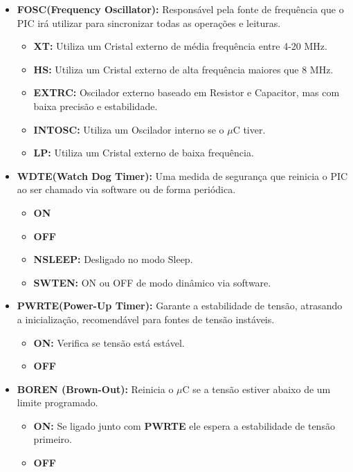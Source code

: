\documentclass[12pt,a4paper]{book}
\begin{document}
\begin{itemize}
    \item \textbf{FOSC(Frequency Oscillator):} Responsável pela fonte de frequência que o PIC irá utilizar para sincronizar todas as operações e leituras.
    \begin{itemize}
        \item \textbf{XT:} Utiliza um Cristal externo de média frequência entre 4-20 MHz.
        \item \textbf{HS:} Utiliza um Cristal externo de alta frequência maiores que 8 MHz.
        \item \textbf{EXTRC:} Oscilador externo baseado em Resistor e Capacitor, mas com baixa precisão e estabilidade.
        \item \textbf{INTOSC:} Utiliza um Oscilador interno se o $\mu$C tiver.
        \item \textbf{LP:} Utiliza um Cristal externo de baixa frequência.
    \end{itemize}
     \item \textbf{WDTE(Watch Dog Timer):} Uma medida de segurança que reinicia o PIC ao ser chamado via software ou de forma periódica.
    \begin{itemize}
        \item \textbf{ON}
        \item \textbf{OFF}
        \item \textbf{NSLEEP:} Desligado no modo Sleep.
        \item \textbf{SWTEN:} ON ou OFF de modo dinâmico via software.
    \end{itemize}
    \item \textbf{PWRTE(Power-Up Timer):} Garante a estabilidade de tensão, atrasando a inicialização, recomendável para fontes de tensão instáveis.
    \begin{itemize}
        \item \textbf{ON:} Verifica se tensão está estável.
        \item \textbf{OFF}
    \end{itemize}
    \item \textbf{BOREN (Brown-Out):} Reinicia o $\mu$C se a tensão estiver abaixo de um limite programado.
    \begin{itemize}
        \item \textbf{ON:} Se ligado junto com \textbf{PWRTE} ele espera a estabilidade de tensão primeiro.
        \item \textbf{OFF}
    \end{itemize}

\end{itemize}
\end{document}

